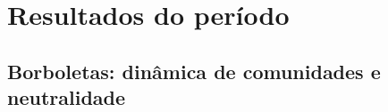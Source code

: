 \section{Resultados do período}


\subsection{Borboletas: dinâmica de comunidades e neutralidade} %
\label{sec:dinamica-temporal-borb} 

